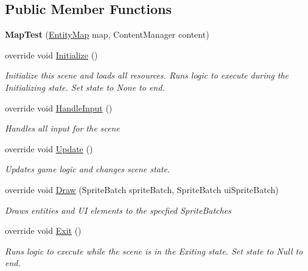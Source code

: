 \subsection*{Public Member Functions}
\begin{DoxyCompactItemize}
\item 
\hypertarget{class_midnight_blue_1_1_testing_1_1_map_test_a7fb98572efcce64a85eaec1363fdddd4}{}\label{class_midnight_blue_1_1_testing_1_1_map_test_a7fb98572efcce64a85eaec1363fdddd4} 
{\bfseries Map\+Test} (\hyperlink{class_m_b2_d_1_1_entity_component_1_1_entity_map}{Entity\+Map} map, Content\+Manager content)
\item 
override void \hyperlink{class_midnight_blue_1_1_testing_1_1_map_test_adcaa2f37efbf5764b48d297cabf17784}{Initialize} ()
\begin{DoxyCompactList}\small\item\em Initialize this scene and loads all resources. Runs logic to execute during the Initializing state. Set state to None to end. \end{DoxyCompactList}\item 
override void \hyperlink{class_midnight_blue_1_1_testing_1_1_map_test_ad7e54e4aec415ccf6e89ce8a8876d259}{Handle\+Input} ()
\begin{DoxyCompactList}\small\item\em Handles all input for the scene \end{DoxyCompactList}\item 
override void \hyperlink{class_midnight_blue_1_1_testing_1_1_map_test_ae4bb817dd9c5b55bd1d818de9f527c7c}{Update} ()
\begin{DoxyCompactList}\small\item\em Updates game logic and changes scene state. \end{DoxyCompactList}\item 
override void \hyperlink{class_midnight_blue_1_1_testing_1_1_map_test_a03d0a9349662afafaa301a8581fbf01f}{Draw} (Sprite\+Batch sprite\+Batch, Sprite\+Batch ui\+Sprite\+Batch)
\begin{DoxyCompactList}\small\item\em Draws entities and UI elements to the specfied Sprite\+Batches \end{DoxyCompactList}\item 
override void \hyperlink{class_midnight_blue_1_1_testing_1_1_map_test_a7dfcf609b9fd898f377297a0075d2159}{Exit} ()
\begin{DoxyCompactList}\small\item\em Runs logic to execute while the scene is in the Exiting state. Set state to Null to end. \end{DoxyCompactList}\item 

\end{DoxyCompactItemize}
